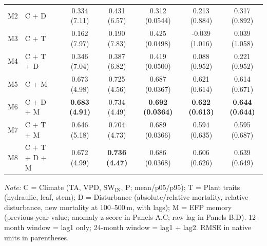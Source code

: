 \begin{table}[htbp]
\begin{tabular}{llcccccc}
M2 & C + D &  & 0.334 (7.11) & 0.431 (6.57) & 0.312 (0.0544) & 0.213 (0.884) & 0.317 (0.892) \\
M3 & C + T &  & 0.162 (7.97) & 0.190 (7.83) & 0.425 (0.0498) & -0.039 (1.016) & 0.039 (1.058) \\
M4 & C + T + D &  & 0.346 (7.04) & 0.387 (6.82) & 0.419 (0.0500) & 0.088 (0.952) & 0.221 (0.952) \\
M5 & C + M &  & 0.673 (4.98) & 0.725 (4.56) & 0.687 (0.0367) & 0.621 (0.614) & 0.614 (0.671) \\
M6 & C + D + M &  & \textbf{0.683 (4.91)} & 0.734 (4.49) & \textbf{0.692 (0.0364)} & \textbf{0.622 (0.613)} & \textbf{0.644 (0.644)} \\
M7 & C + T + M &  & 0.646 (5.18) & 0.704 (4.73) & 0.689 (0.0366) & 0.594 (0.635) & 0.595 (0.687) \\
M8 & C + T + D + M &  & 0.672 (4.99) & \textbf{0.736 (4.47)} & 0.686 (0.0368) & 0.606 (0.626) & 0.639 (0.649) \\
\midrule
\bottomrule
\end{tabular}
\vspace{2pt}
\begin{minipage}{\linewidth}
\footnotesize
\textit{Note:} C = Climate (TA, VPD, SW$_\mathrm{IN}$, P; mean/p05/p95); T = Plant traits (hydraulic, leaf, stem); D = Disturbance (absolute/relative mortality, relative disturbance, new mortality at 100--500\,m, with lags); M = EFP memory (previous-year value; anomaly z-score in Panels A,C; raw lag in Panels B,D). 12-month window = lag1 only; 24-month window = lag1 + lag2. RMSE in native units in parentheses.
\end{minipage}
\end{table}

